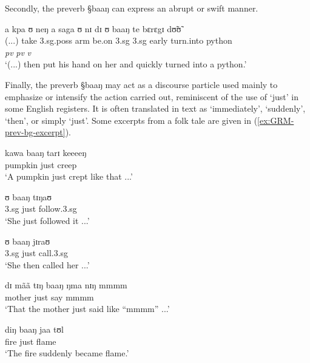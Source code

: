 Secondly, the preverb  {\S baaŋ} can express an  abrupt or
swift   manner.

\begin{exe}
\ex\label{sec:GRM-prev-bg-time}
 a kpa ʊ neŋ a saga ʊ nɪ dɪ ʊ baaŋ te bɛrɛgɪ dʊ̃ʊ̃\\
     {(...})  {\conn}  take {\sc 3.sg.poss} arm {\conn} {be.on} {\sc
3.sg}  {\postp} {\conn} {\sc 3.sg} {\mod} {early} turn.into python \\
{} {} {} {} {} {} {} {} {} {} {} {\it pv} {\it pv} {\it v} {} \\

\glt  `(...) then put his hand on her  and quickly turned into
a python.' 
\end{exe}
      
Finally, the preverb  {\S baaŋ} may act as a discourse particle used mainly to
emphasize or intensify the action carried out, reminiscent of  the use of 
`just' in
some English registers.  It is often translated in text as `immediately',
`suddenly', `then',  or simply `just'. Some excerpts from a folk tale are
given in
(\ref{ex:GRM-prev-bg-excerpt}).



%  
 \begin{exe}
\ex\label{ex:GRM-prev-bg-excerpt}
\begin{xlist}
\ex
\gll kawa baaŋ tarɪ keeeeŋ \\
pumpkin just creep {\advm}\\
\glt `A pumpkin just crept like that ...' 

\ex
\gll ʊ baaŋ tɪŋaʊ \\
{\sc 3.sg} just follow.{\sc 3.sg}\\
 \glt `She just followed it ...'

\ex
\gll ʊ baaŋ jɪraʊ \\
{\sc 3.sg} just call.{\sc 3.sg}\\
 \glt `She then called her ...'

\ex
\gll dɪ mãã tɪŋ baaŋ ŋma nɪŋ mmmm\\
{\comp} mother {\art} just say {\advm} mmmm\\
\glt `That the mother just said like ``mmmm'' ...'

\ex
\gll diŋ baaŋ jaa tʊl\\
fire  just {\ident} flame\\
\glt `The fire suddenly became flame.'
\end{xlist}
 \end{exe}
% 



